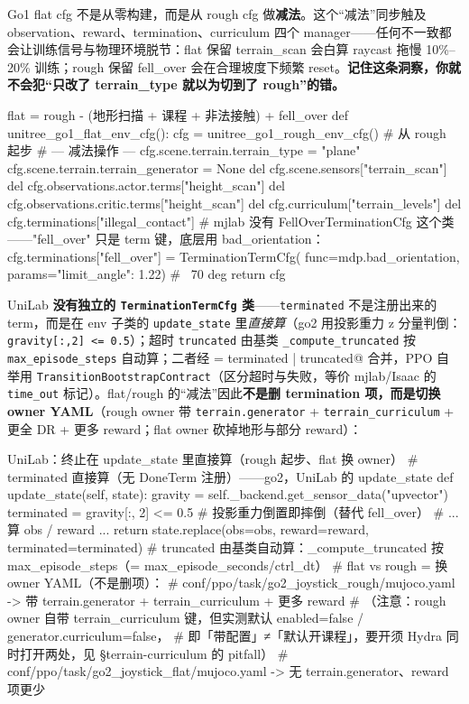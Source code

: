\begin{insight}\label{ins:rlmc-ql-subtraction}
Go1 flat cfg 不是从零构建，而是从 rough cfg 做\textbf{减法}。这个“减法”同步触及 observation、reward、termination、curriculum 四个 manager——任何不一致都会让训练信号与物理环境脱节：flat 保留 terrain\_scan 会白算 raycast 拖慢 10\%--20\% 训练；rough 保留 fell\_over 会在合理坡度下频繁 reset。\textbf{记住这条洞察，你就不会犯“只改了 terrain\_type 就以为切到了 rough”的错。}
\end{insight}

\begin{codebox}[Python]{flat = rough - (地形扫描 + 课程 + 非法接触) + fell\_over}
def unitree_go1_flat_env_cfg():
    cfg = unitree_go1_rough_env_cfg()        # 从 rough 起步
    # --- 减法操作 ---
    cfg.scene.terrain.terrain_type = "plane"
    cfg.scene.terrain.terrain_generator = None
    del cfg.scene.sensors["terrain_scan"]
    del cfg.observations.actor.terms["height_scan"]
    del cfg.observations.critic.terms["height_scan"]
    del cfg.curriculum["terrain_levels"]
    del cfg.terminations["illegal_contact"]
    # mjlab 没有 FellOverTerminationCfg 这个类——"fell_over" 只是 term 键，底层用 bad_orientation：
    cfg.terminations["fell_over"] = TerminationTermCfg(
        func=mdp.bad_orientation, params={"limit_angle": 1.22})   # ~70 deg
    return cfg
\end{codebox}

UniLab \textbf{没有独立的 \texttt{TerminationTermCfg} 类}——\verb|terminated| 不是注册出来的 term，而是在 env 子类的 \verb|update_state| 里\emph{直接算}（go2 用投影重力 z 分量判倒：\verb|gravity[:,2] <= 0.5|）；超时 \verb|truncated| 由基类 \verb|_compute_truncated| 按 \verb|max_episode_steps| 自动算；二者经 \verb@done = terminated | truncated@ 合并，PPO 自举用 \verb|TransitionBootstrapContract|（区分超时与失败，等价 mjlab/Isaac 的 \verb|time_out| 标记）。flat/rough 的“减法”因此\textbf{不是删 termination 项，而是切换 owner YAML}（rough owner 带 \verb|terrain.generator| + \verb|terrain_curriculum| + 更全 DR + 更多 reward；flat owner 砍掉地形与部分 reward）：

\begin{codebox}[Python]{UniLab：终止在 update\_state 里直接算（rough 起步、flat 换 owner）}
# terminated 直接算（无 DoneTerm 注册）——go2，UniLab 的 update_state
def update_state(self, state):
    gravity = self._backend.get_sensor_data("upvector")
    terminated = gravity[:, 2] <= 0.5          # 投影重力倒置即摔倒（替代 fell_over）
    # ... 算 obs / reward ...
    return state.replace(obs=obs, reward=reward, terminated=terminated)
# truncated 由基类自动算：_compute_truncated 按 max_episode_steps（= max_episode_seconds/ctrl_dt）
# flat vs rough = 换 owner YAML（不是删项）：
#   conf/ppo/task/go2_joystick_rough/mujoco.yaml  -> 带 terrain.generator + terrain_curriculum + 更多 reward
#     （注意：rough owner 自带 terrain_curriculum 键，但实测默认 enabled=false / generator.curriculum=false，
#       即「带配置」≠「默认开课程」，要开须 Hydra 同时打开两处，见 §terrain-curriculum 的 pitfall）
#   conf/ppo/task/go2_joystick_flat/mujoco.yaml   -> 无 terrain.generator、reward 项更少
\end{codebox}

